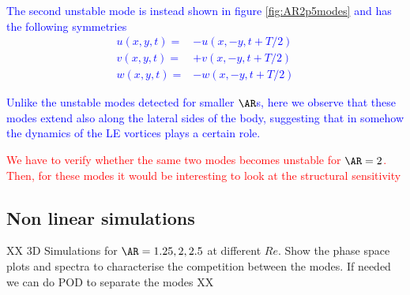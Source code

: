 \textcolor{blue}{
The second unstable mode is instead shown in figure \ref{fig:AR2p5modes} and has the following symmetries
\begin{equation}
  \begin{aligned}
    u(x,y,t) = & -u(x,-y,t+T/2) \\
    v(x,y,t) = & +v(x,-y,t+T/2) \\
    w(x,y,t) = & -w(x,-y,t+T/2)
  \end{aligned}
\end{equation}
}

\textcolor{blue}{
Unlike the unstable modes detected for smaller $\AR$s, here we observe that these modes extend also along the lateral sides of the body, suggesting that in somehow the dynamics of the LE vortices plays a certain role.}

\textcolor{red}{We have to verify whether the same two modes becomes unstable for $\AR=2$. Then, for these modes it would be interesting to look at the structural sensitivity}

\subsection{Non linear simulations}

XX 3D Simulations for $\AR=1.25, 2, 2.5$ at different $Re$. Show the phase space plots and spectra to characterise the competition between the modes. If needed we can do POD to separate the modes XX

